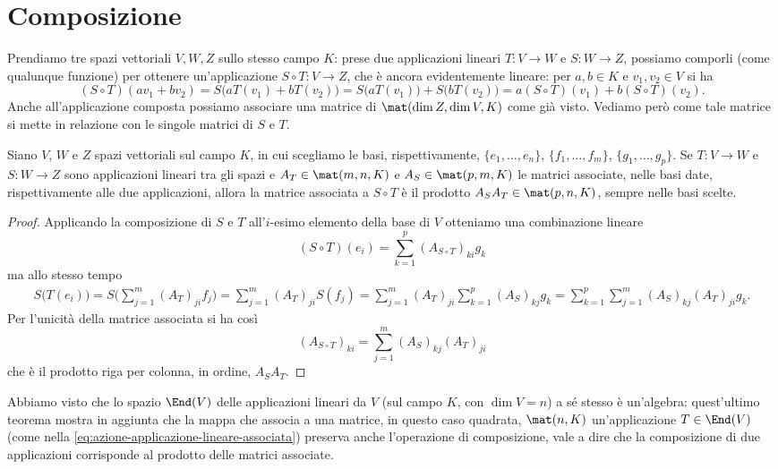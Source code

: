 \section{Composizione}
Prendiamo tre spazi vettoriali $V,W,Z$ sullo stesso campo $K$: prese due applicazioni lineari $T\colon V\to W$ e $S\colon W\to Z$, possiamo comporli (come qualunque funzione) per ottenere un'applicazione $S\circ T\colon V\to Z$, che è ancora evidentemente lineare: per $a,b\in K$ e $v_1,v_2\in V$ si ha
\begin{equation}
	(S\circ T)(av_1+bv_2)=S\big(aT(v_1)+bT(v_2)\big)=S\big(aT(v_1)\big)+S\big(bT(v_2)\big)=a(S\circ T)(v_1)+b(S\circ T)(v_2).
	\label{eq:linearita-applicazione-composta}
\end{equation}
Anche all'applicazione composta possiamo associare una matrice di $\mat(\dim Z,\dim V,K)$ come già visto.
Vediamo però come tale matrice si mette in relazione con le singole matrici di $S$ e $T$.
\begin{teorema} \label{t:matrice-applicazione-composta}
	Siano $V$, $W$ e $Z$ spazi vettoriali sul campo $K$, in cui scegliamo le basi, rispettivamente, $\{e_1,\dots,e_n\}$, $\{f_1,\dots,f_m\}$, $\{g_1,\dots,g_p\}$.
	Se $T\colon V\to W$ e $S\colon W\to Z$ sono applicazioni lineari tra gli spazi e $A_T\in\mat(m,n,K)$ e $A_S\in\mat(p,m,K)$ le matrici associate, nelle basi date, rispettivamente alle due applicazioni, allora la matrice associata a $S\circ T$ è il prodotto $A_SA_T\in\mat(p,n,K)$, sempre nelle basi scelte.
\end{teorema}
\begin{proof}
	Applicando la composizione di $S$ e $T$ all'$i$-esimo elemento della base di $V$ otteniamo una combinazione lineare
	\begin{equation}
		(S\circ T)(e_i)=\sum_{k=1}^p(A_{S\circ T})_{ki}g_k
	\end{equation}
	ma allo stesso tempo
	\begin{multline}
		S\big(T(e_i)\big)=S\bigg(\sum_{j=1}^m(A_T)_{ji}f_j\bigg)=\sum_{j=1}^m(A_T)_{ji}S(f_j)=\sum_{j=1}^m(A_T)_{ji}\sum_{k=1}^p(A_S)_{kj}g_k=\sum_{k=1}^p\sum_{j=1}^m(A_S)_{kj}(A_T)_{ji}g_k.
	\end{multline}
	Per l'unicità della matrice associata si ha cos\`i
	\begin{equation}
		(A_{S\circ T})_{ki}=\sum_{j=1}^m(A_S)_{kj}(A_T)_{ji}
	\end{equation}
	che è il prodotto riga per colonna, in ordine, $A_SA_T$.
\end{proof}
Abbiamo visto che lo spazio $\End(V)$ delle applicazioni lineari da $V$ (sul campo $K$, con $\dim V=n$) a s\'e stesso è un'algebra: quest'ultimo teorema mostra in aggiunta che la mappa che associa a una matrice, in questo caso quadrata, $\mat(n,K)$ un'applicazione $T\in\End(V)$ (come nella \eqref{eq:azione-applicazione-lineare-associata}) preserva anche l'operazione di composizione, vale a dire che la composizione di due applicazioni corrisponde al prodotto delle matrici associate.
